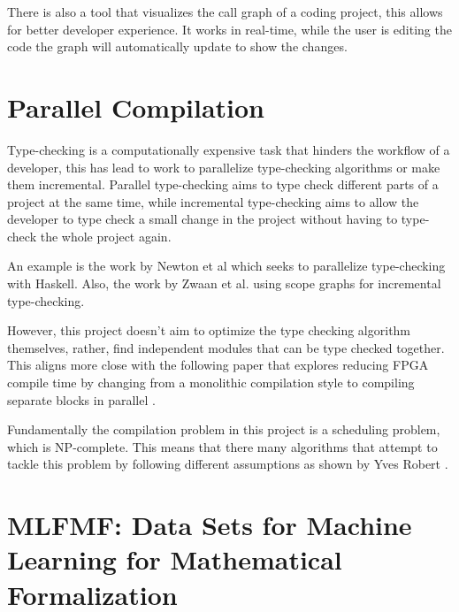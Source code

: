 There is also a tool \cite{call_graph_vis} that visualizes the call graph of a
coding project, this allows for better developer experience. It works in
real-time, while the user is editing the code the graph will automatically
update to show the changes.

\section{Parallel Compilation}

Type-checking is a computationally expensive task that hinders the workflow of
a developer, this has lead to work to parallelize type-checking algorithms or
make them incremental. Parallel type-checking aims to type check different
parts of a project at the same time, while incremental type-checking aims to
allow the developer to type check a small change in the project without having
to type-check the whole project again.

An example is the work by Newton et al \cite{paralele_comp_haskell} which seeks to
parallelize type-checking with Haskell. Also, the work by Zwaan et al.
\cite{incremental_type_checking} using scope graphs for incremental
type-checking.

However, this project doesn't aim to optimize the type checking algorithm
themselves, rather, find independent modules that can be type checked together.
This aligns more close with the following paper that explores reducing FPGA
compile time by changing from a monolithic compilation style to compiling
separate blocks in parallel \cite{FPGA}.

Fundamentally the compilation problem in this project is a scheduling problem,
which is NP-complete\cite{scheduling}. This means that there many algorithms
that attempt to tackle this problem by following different assumptions as shown
by Yves Robert \cite{scheduling}.



\section{MLFMF: Data Sets for Machine Learning for Mathematical Formalization}

